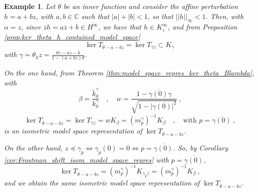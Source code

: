 \documentclass{article}
\numberwithin{equation}{section}
\theoremstyle{plain}
\newtheorem{ex}[thm]{Example}
\newcommand{\Hinf}{\ensuremath{H^\infty}}
\newcommand{\CC}{\ensuremath{\mathbb{C}}}
\newcommand{\ol}[1]{\ensuremath{\overline{#1}}}
\begin{document}
\begin{ex}
Let $\theta$ be an inner function and consider the affine perturbation $h=a+bz$, with $a,b\in\CC$ such that $|a|+|b|<1$, so that $||h||_\infty <1$.
Then, with $\alpha = z$, since $\ol z h = a \ol z + b \in \ol\Hinf$, we have that $h\in K_z^\infty$, and from Proposition \ref{prop:ker_theta_h_contained_model_space}
\begin{equation}
\ker T_{\ol \theta - a - bz} = \ker T_{\ol\gamma z} \subset K_\gamma \,
\end{equation}
with $\gamma = \theta_h z = \frac{\theta z - \ol a z - \ol b}{1 - (a+bz) \theta}$.

On the one hand, from Theorem \ref{thm:model_space_repres_ker_theta_Blambda},
with
\begin{equation}
\beta = \frac{\tilde k^\gamma_0}{k^\gamma_0}
\quad , \quad
w = \frac{1 - \ol{\gamma(0)} \gamma}{\sqrt{1 - |\gamma(0)|^2}}\ ,
\end{equation}
\begin{equation} \label{eq:ex:affine_gamma_z}
\ker T_{\ol \theta - a - bz}
= \ker T_{\ol\gamma z}
= w K_\beta
= \left( m_{p}^\gamma \right)^{-1} K_\beta
\quad , \quad
\text{with } p = \ol{\gamma(0)} \ ,
\end{equation}
is an isometric model space representation of $\ker T_{\ol \theta - a - bz}$.

On the other hand, $z \preceq \gamma_p \iff \gamma_p(0) = 0 \iff p = \ol{\gamma(0)}$.
So, by Corollary \ref{cor:Frostman_shift_isom_model_space_repres} with $p = \ol{\gamma(0)}$,
\begin{equation} \label{eq:ex:affine_frostman_shift}
\ker T_{\ol \theta - a - bz}
= \left( m_{p}^\gamma \right)^{-1} K_{\gamma_p \ol z}
= \left( m_{p}^\gamma \right)^{-1} K_\beta \ ,
\end{equation}
and we obtain the same isometric model space representation of $\ker T_{\ol\theta -a-bz}$.
\end{ex}
\end{document}
